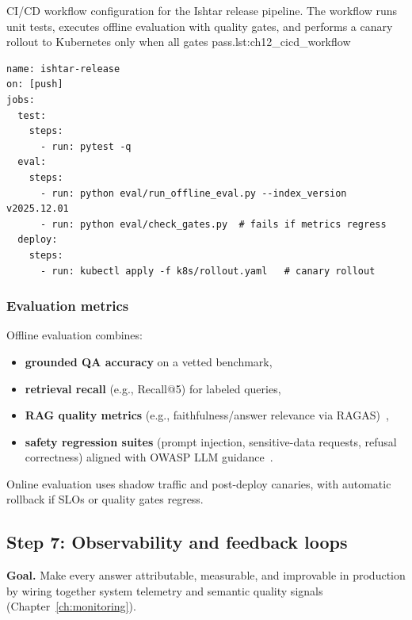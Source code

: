 \begin{codebox}{CI/CD workflow configuration for the Ishtar release pipeline. The workflow runs unit tests, executes offline evaluation with quality gates, and performs a canary rollout to Kubernetes only when all gates pass.}{lst:ch12_cicd_workflow}
\begin{verbatim}
name: ishtar-release
on: [push]
jobs:
  test:
    steps:
      - run: pytest -q
  eval:
    steps:
      - run: python eval/run_offline_eval.py --index_version v2025.12.01
      - run: python eval/check_gates.py  # fails if metrics regress
  deploy:
    steps:
      - run: kubectl apply -f k8s/rollout.yaml   # canary rollout
\end{verbatim}
\end{codebox}

\subsubsection{Evaluation metrics}
Offline evaluation combines:
\begin{itemize}
    \item \textbf{grounded QA accuracy} on a vetted benchmark,
    \item \textbf{retrieval recall} (e.g., Recall@5) for labeled queries,
    \item \textbf{RAG quality metrics} (e.g., faithfulness/answer relevance via RAGAS)~\cite{ragas_eacl2024},
    \item \textbf{safety regression suites} (prompt injection, sensitive-data requests, refusal correctness) aligned with OWASP LLM guidance~\cite{OWASP2024LLMTop10}.
\end{itemize}
Online evaluation uses shadow traffic and post-deploy canaries, with automatic rollback if SLOs or quality gates regress.


\subsection{Step 7: Observability and feedback loops}
\label{sec:ishtar-step-observability}

\textbf{Goal.} Make every answer attributable, measurable, and improvable in production by wiring together system telemetry and semantic quality signals (Chapter~\ref{ch:monitoring}).

